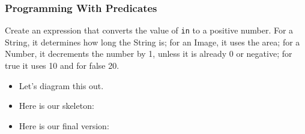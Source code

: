 \documentclass{beamer}
\begin{document}

\begin{frame}
  \frametitle{Programming With Predicates}
  Create an expression that converts the value of \texttt{in} to a positive number. For a String, it determines how long the String is; for an Image, it uses the area; for a Number, it decrements the number by 1, unless it is already 0 or negative; for true it uses 10 and for false 20.
\begin{itemize}
\item<2-> Let's diagram this out.
\item<3-> Here is our skeleton: \predicateSkeleton
\item<4-> Here is our final version: \predicateFinal
\end{itemize}

\end{frame}

\end{document}
